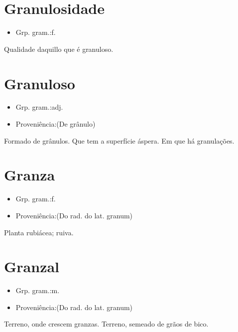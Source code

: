 \section{Granulosidade}
\begin{itemize}
\item {Grp. gram.:f.}
\end{itemize}
Qualidade daquillo que é granuloso.
\section{Granuloso}
\begin{itemize}
\item {Grp. gram.:adj.}
\end{itemize}
\begin{itemize}
\item {Proveniência:(De \textunderscore grânulo\textunderscore )}
\end{itemize}
Formado de grânulos.
Que tem a superfície áspera.
Em que há granulações.
\section{Granza}
\begin{itemize}
\item {Grp. gram.:f.}
\end{itemize}
\begin{itemize}
\item {Proveniência:(Do rad. do lat. \textunderscore granum\textunderscore )}
\end{itemize}
Planta rubiácea; ruiva.
\section{Granzal}
\begin{itemize}
\item {Grp. gram.:m.}
\end{itemize}
\begin{itemize}
\item {Proveniência:(Do rad. do lat. \textunderscore granum\textunderscore )}
\end{itemize}
Terreno, onde crescem granzas.
Terreno, semeado de grãos de bico.
